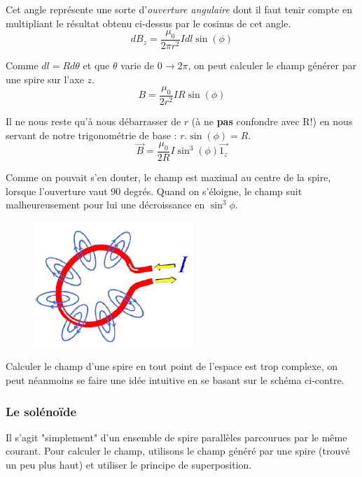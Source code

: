 \documentclass	[11pt, a4paper, openany]{book}
\begin{document}
Cet angle représente une sorte d'\textit{ouverture angulaire} dont il faut tenir compte en multipliant le résultat obtenu ci-dessus par le cosinus de cet angle.
\begin{equation}
	dB_z = \frac{\mu_0}{2\pi r^2}Idl\sin (\phi)
\end{equation}

Comme $dl = Rd\theta$ et que $\theta$ varie de $0 \rightarrow 2\pi$, on peut calculer le champ générer par une spire sur l'axe $z$.
\begin{equation}
	B = \frac{\mu_0}{2 r^2} IR \sin (\phi)
\end{equation}

Il ne nous reste qu'à nous débarrasser de $r$ (à ne \textbf{pas} confondre avec R!) en nous servant de notre trigonométrie de base : $r.\sin (\phi) = R$.
\begin{equation}
	\vec{B} = \frac{\mu_0}{2R}I \sin^3(\phi)\vec{1_z}
\end{equation}


Comme on pouvait s'en douter, le champ est maximal au centre de la spire, lorsque l'ouverture vaut 90 degrés. Quand on s'éloigne, le champ suit malheureusement pour lui une décroissance en $\sin^3\phi$.\\

\begin{figure}
	\includegraphics[scale=0.50]{magneto/image10.png}
\end{figure}

Calculer le champ d'une spire en tout point de l'espace est trop complexe, on peut néanmoins se faire une idée intuitive en se basant sur le schéma ci-contre.


\subsubsection{Le solénoïde}
Il s'agit "simplement" d'un ensemble de spire parallèles parcourues par le même courant. Pour calculer le champ, utilisons le champ généré par une spire (trouvé un peu plus haut) et utiliser le principe de superposition.\\
\end{document}
